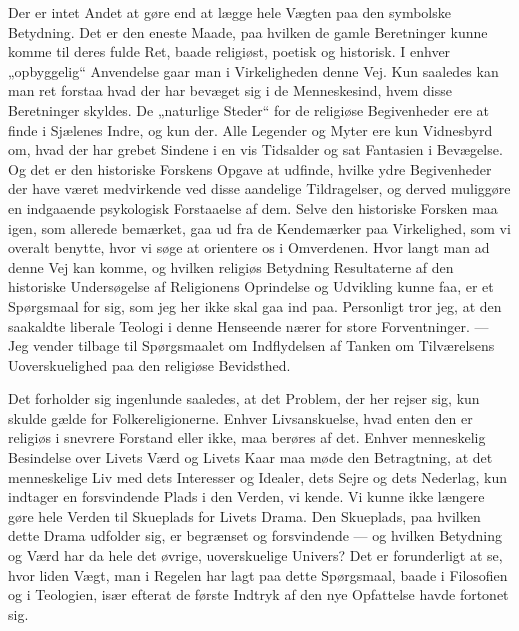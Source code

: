 \documentclass[12pt,a4paper]{article}
\newcommand{\opage}[1]{\marginnote{\footnotesize\textit{[#1]}}}
\begin{document}
Der er intet Andet at gøre end at lægge hele Vægten paa den symbolske
Betydning. Det er den eneste Maade, paa hvilken de gamle Beretninger kunne
komme til deres fulde Ret, baade religiøst, poetisk og historisk. I enhver
„opbyggelig“ Anvendelse gaar man i Virkeligheden denne Vej. Kun saaledes
kan man ret forstaa hvad der har bevæget sig i de Menneskesind, hvem disse
Beretninger skyldes. De „naturlige Steder“ for de religiøse Begivenheder
ere at finde i Sjælenes Indre, og kun der. Alle Legender og Myter ere kun
Vidnesbyrd om, hvad der har grebet Sindene i en vis Tidsalder og sat
Fantasien i Bevægelse. Og det er den historiske Forskens Opgave at
udfinde, hvilke ydre Begivenheder der have været medvirkende ved disse
aandelige Tildragelser, og derved muliggøre en indgaaende psykologisk
Forstaaelse af dem. Selve den historiske Forsken maa igen, som allerede
bemærket, gaa ud fra de Kendemærker paa Virkelighed, som vi overalt
benytte, hvor vi søge at orientere os i Omverdenen. Hvor langt man ad
denne Vej kan komme, og hvilken religiøs Betydning Resultaterne af den
historiske Undersøgelse af Religionens Oprindelse og Udvikling kunne faa,
er et Spørgsmaal for sig, som jeg her ikke skal gaa ind paa. Personligt
tror jeg, at den saakaldte liberale Teologi i denne Henseende nærer for
store Forventninger. --- Jeg vender tilbage til Spørgsmaalet om
Indflydelsen af Tanken om \opage{11} Tilværelsens Uoverskuelighed paa den religiøse
Bevidsthed.

Det forholder sig ingenlunde saaledes, at det Problem, der her rejser sig,
kun skulde gælde for Folkereligionerne. Enhver Livsanskuelse, hvad enten
den er religiøs i snevrere Forstand eller ikke, maa berøres af det. Enhver
menneskelig Besindelse over Livets Værd og Livets Kaar maa møde den
Betragtning, at det menneskelige Liv med dets Interesser og Idealer, dets
Sejre og dets Nederlag, kun indtager en forsvindende Plads i den Verden, vi
kende. Vi kunne ikke længere gøre hele Verden til Skueplads for Livets
Drama. Den Skueplads, paa hvilken dette Drama udfolder sig, er begrænset og
forsvindende --- og hvilken Betydning og Værd har da hele det øvrige,
uoverskuelige Univers? Det er forunderligt at se, hvor liden Vægt, man i
Regelen har lagt paa dette Spørgsmaal, baade i Filosofien og i Teologien,
især efterat de første Indtryk af den nye Opfattelse havde fortonet sig.
\end{document}
